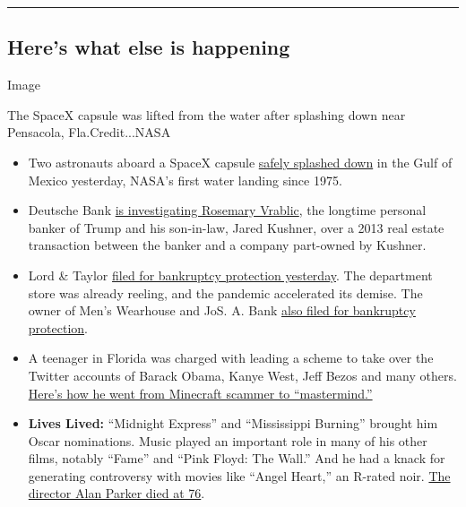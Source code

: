 \begin{center}\rule{0.5\linewidth}{\linethickness}\end{center}

\hypertarget{heres-what-else-is-happening}{%
\subsection{Here's what else is
happening}\label{heres-what-else-is-happening}}

Image

The SpaceX capsule was lifted from the water after splashing down near
Pensacola, Fla.Credit...NASA

\begin{itemize}
\item
  Two astronauts aboard a SpaceX capsule
  \href{https://www.nytimes3xbfgragh.onion/2020/08/02/science/spacex-astronauts-splashdown.html}{safely
  splashed down} in the Gulf of Mexico yesterday, NASA's first water
  landing since 1975.
\item
  Deutsche Bank
  \href{https://www.nytimes3xbfgragh.onion/2020/08/02/business/kushner-deutsche-trump-rosemary-vrablic.html}{is
  investigating Rosemary Vrablic}, the longtime personal banker of Trump
  and his son-in-law, Jared Kushner, over a 2013 real estate transaction
  between the banker and a company part-owned by Kushner.
\item
  Lord \& Taylor
  \href{https://www.nytimes3xbfgragh.onion/2020/08/02/business/Lord-and-Taylor-Bankruptcy.html}{filed
  for bankruptcy protection yesterday}. The department store was already
  reeling, and the pandemic accelerated its demise. The owner of Men's
  Wearhouse and JoS. A. Bank
  \href{https://www.nytimes3xbfgragh.onion/2020/08/03/business/tailored-brands-mens-wearhouse-bankruptcy.html}{also
  filed for bankruptcy protection}.
\item
  A teenager in Florida was charged with leading a scheme to take over
  the Twitter accounts of Barack Obama, Kanye West, Jeff Bezos and many
  others.
  \href{https://www.nytimes3xbfgragh.onion/2020/08/02/technology/florida-teenager-twitter-hack.html}{Here's
  how he went from Minecraft scammer to ``mastermind.''}
\item
  \textbf{Lives Lived:} ``Midnight Express'' and ``Mississippi Burning''
  brought him Oscar nominations. Music played an important role in many
  of his other films, notably ``Fame'' and ``Pink Floyd: The Wall.'' And
  he had a knack for generating controversy with movies like ``Angel
  Heart,'' an R-rated noir.
  \href{https://www.nytimes3xbfgragh.onion/2020/07/31/movies/alan-parker-versatile-film-director-is-dead-at-76.html}{The
  director Alan Parker died at 76}.
\end{itemize}

